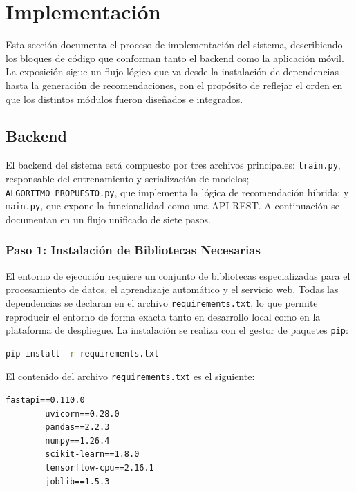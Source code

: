 \documentclass[11pt, letterpaper]{article}
\begin{document}
	\section{Implementación}
	
	Esta sección documenta el proceso de implementación del sistema, describiendo
	los bloques de código que conforman tanto el backend como la aplicación móvil.
	La exposición sigue un flujo lógico que va desde la instalación de dependencias
	hasta la generación de recomendaciones, con el propósito de reflejar el orden
	en que los distintos módulos fueron diseñados e integrados.
	
	\subsection{Backend}
	
	El backend del sistema está compuesto por tres archivos principales:
	\texttt{train.py}, responsable del entrenamiento y serialización de modelos;
	\texttt{ALGORITMO\_PROPUESTO.py}, que implementa la lógica de recomendación
	híbrida; y \texttt{main.py}, que expone la funcionalidad como una API REST.
	A continuación se documentan en un flujo unificado de siete pasos.
	
	\subsubsection{Paso 1: Instalación de Bibliotecas Necesarias}
	
	El entorno de ejecución requiere un conjunto de bibliotecas especializadas
	para el procesamiento de datos, el aprendizaje automático y el servicio web.
	Todas las dependencias se declaran en el archivo \texttt{requirements.txt},
	lo que permite reproducir el entorno de forma exacta tanto en desarrollo local
	como en la plataforma de despliegue. La instalación se realiza con el gestor
	de paquetes \texttt{pip}:
	
	\begin{lstlisting}[language=bash, caption=Instalación de dependencias]
		pip install -r requirements.txt
	\end{lstlisting}
	
	El contenido del archivo \texttt{requirements.txt} es el siguiente:
	
	\begin{lstlisting}[caption=requirements.txt]
		fastapi==0.110.0
		uvicorn==0.28.0
		pandas==2.2.3
		numpy==1.26.4
		scikit-learn==1.8.0
		tensorflow-cpu==2.16.1
		joblib==1.5.3
	\end{lstlisting}
	
\end{document}
